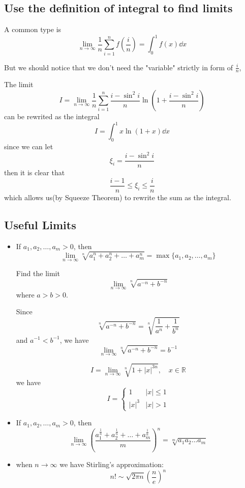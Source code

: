 \documentclass{overview}
\begin{document}
\subsection{Use the definition of integral to find limits}

A common type is
\[
	\lim_{n \to \infty} \frac{1}{n}\sum_{i=1}^n f\left(\frac{i}{n}\right)
	= \int_0^1 f(x) \dd x
\] 

But we should notice that we don't need the "variable" strictly in form of $\frac{i}{n}$, 
\begin{example}
	The limit
	\[
		I=\lim_{n \to \infty} \frac{1}{n}\sum_{i=1}^n
		\frac{i-\sin^2i}{n}\ln\left(1+\frac{i-\sin^2i}{n}\right)
	\] 
	can be rewrited as the integral
	\[
		I=\int _0^1 x \ln(1+x) \dd x
	\] 
	since we can let
	\[
		\xi_i=\frac{i-\sin^2i}{n}
	\] 
	then it is clear that
	\[
		\frac{i-1}{n} \leq \xi_i \leq \frac{i}{n}
	\] 
	which allows us(by Squeeze Theorem) to rewrite the sum as the integral.
	
\end{example}

\subsection{Useful Limits}

\begin{itemize}
	\item If $ a_1, a_2, \ldots, a_m > 0$, then
		\[
			\lim_{n \to \infty} \sqrt[n]{a_1^n + a_2^n + \ldots + a_m^n} = \max\{a_1, a_2, \ldots, a_m\}
		\]
		\begin{example}
			Find the limit
			\[
				\lim_{n \to \infty} \sqrt[n]{a^{-n} + b^{-n}}
			\]
			where $a>b>0$.
			\begin{answer}
				Since
				\[
					\sqrt[n]{a^{-n} + b^{-n}} = \sqrt[n]{\frac{1}{a^n} + \frac{1}{b^n}}
				\] 
				and $a^{-1} < b^{-1}$, we have
				\[
					\lim_{n \to \infty} \sqrt[n]{a^{-n} + b^{-n}} = b^{-1}
				\]
			\end{answer}
		\end{example}
		\begin{example}
			\[
				I=\lim_{n \to \infty} \sqrt[n]{1+|x|^{3n}}, \quad x \in \mathbb{R}
			\] 
			we have
			\[
				I = \begin{cases}
					1 & |x| \leq 1 \\
					|x|^3 & |x| > 1
				\end{cases}
			\]
		\end{example}
	\item If $ a_1, a_2, \ldots, a_m > 0$, then
		\[
			\lim_{n \to \infty} \left(\dfrac{a_1^{\frac{1}{n}} + a_2^{\frac{1}{n}} + \ldots + a_m^{\frac{1}{n}}}{m}\right)^n 
			=\sqrt[m]{a_1 a_2 \ldots a_m}
		\]
	\item when $n\to\infty$ we have Stirling's approximation:
		\[
			n! \sim \sqrt{2 \pi n} \left(\dfrac{n}{e}\right)^n
		\]
\end{itemize}
\end{document}
